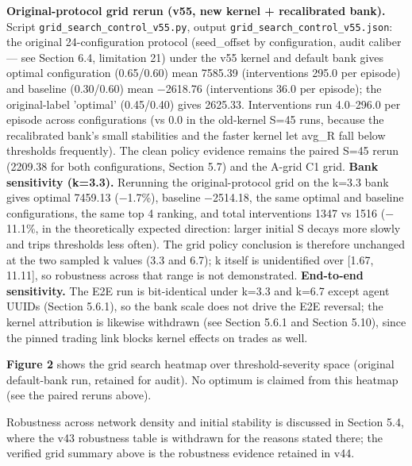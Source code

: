 \documentclass[11pt]{article}
\begin{document}
\textbf{Original-protocol grid rerun (v55, new kernel + recalibrated bank).} Script \texttt{grid\_search\_control\_v55.py}, output \texttt{grid\_search\_control\_v55.json}: the original 24-configuration protocol (seed\_offset by configuration, audit caliber --- see Section 6.4, limitation 21) under the v55 kernel and default bank gives optimal configuration (0.65/0.60) mean 7585.39 (interventions 295.0 per episode) and baseline (0.30/0.60) mean $-$2618.76 (interventions 36.0 per episode); the original-label 'optimal' (0.45/0.40) gives 2625.33. Interventions run 4.0--296.0 per episode across configurations (vs 0.0 in the old-kernel S=45 runs, because the recalibrated bank's small stabilities and the faster kernel let avg\_R fall below thresholds frequently). The clean policy evidence remains the paired S=45 rerun (2209.38 for both configurations, Section 5.7) and the A-grid C1 grid. \textbf{Bank sensitivity (k=3.3).} Rerunning the original-protocol grid on the k=3.3 bank gives optimal 7459.13 ($-$1.7\%), baseline $-$2514.18, the same optimal and baseline configurations, the same top 4 ranking, and total interventions 1347 vs 1516 ($-$11.1\%, in the theoretically expected direction: larger initial S decays more slowly and trips thresholds less often). The grid policy conclusion is therefore unchanged at the two sampled k values (3.3 and 6.7); k itself is unidentified over [1.67, 11.11], so robustness across that range is not demonstrated. \textbf{End-to-end sensitivity.} The E2E run is bit-identical under k=3.3 and k=6.7 except agent UUIDs (Section 5.6.1), so the bank scale does not drive the E2E reversal; the kernel attribution is likewise withdrawn (see Section 5.6.1 and Section 5.10), since the pinned trading link blocks kernel effects on trades as well.

\textbf{Figure 2} shows the grid search heatmap over threshold-severity space (original default-bank run, retained for audit). No optimum is claimed from this heatmap (see the paired reruns above).

Robustness across network density and initial stability is discussed in Section 5.4, where the v43 robustness table is withdrawn for the reasons stated there; the verified grid summary above is the robustness evidence retained in v44.
\end{document}
